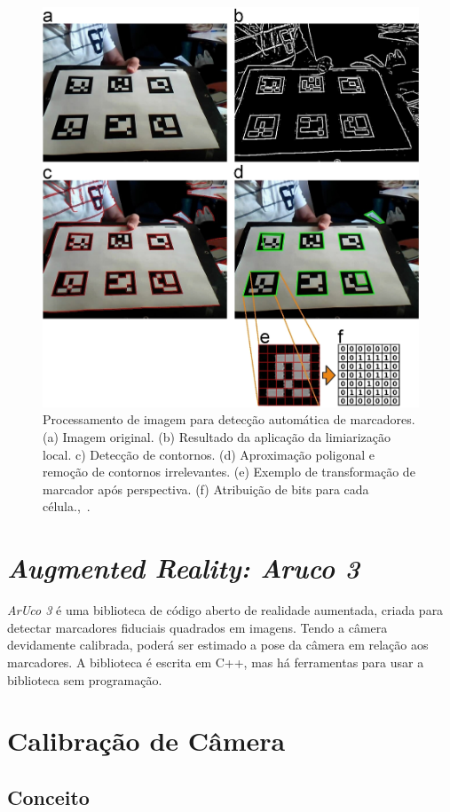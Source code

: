 \begin{figure}[H]
	\centering
	\includegraphics[width=12cm, height=12 cm]{figuras/aruco-processamento.jpg}
	\caption{Processamento de imagem para detecção automática de marcadores. (a) Imagem original. (b) Resultado da aplicação da limiarização local. c) Detecção de contornos. (d) Aproximação poligonal e remoção de contornos irrelevantes. (e) Exemplo de transformação de marcador após perspectiva. (f) Atribuição de bits para cada célula.,~\cite{Aruco2014}.}
	\label{fig:aruco-processamento}
\end{figure}

\section{\textit{Augmented Reality: Aruco 3}}

\textit{ArUco 3} é uma biblioteca de código aberto de realidade aumentada, criada para detectar marcadores fiduciais quadrados em imagens. Tendo a câmera devidamente calibrada, poderá ser estimado a pose da câmera em relação aos marcadores. A biblioteca é escrita em C++, mas há ferramentas para usar a biblioteca sem programação.

\section{Calibração de Câmera}

\subsection{Conceito}

